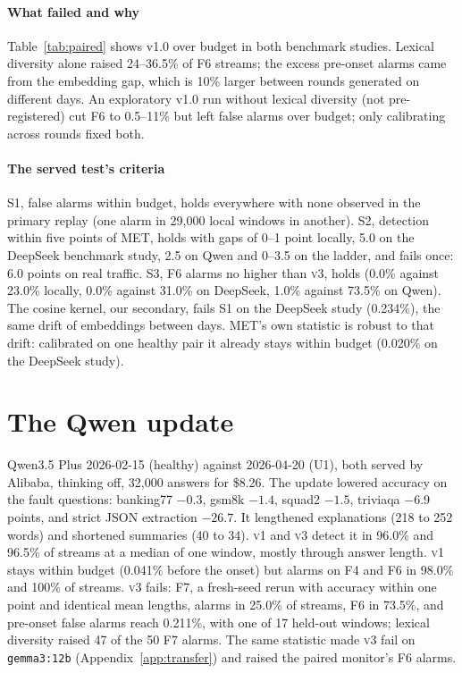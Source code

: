 \documentclass[11pt]{article}
\newcommand{\vone}{\textsc{v1}}
\newcommand{\vthree}{\textsc{v3}}
\begin{document}
\paragraph{What failed and why} Table~\ref{tab:paired} shows v1.0 over budget in
both benchmark studies. Lexical diversity alone raised 24--36.5\% of F6 streams;
the excess pre-onset alarms came from the embedding gap, which is 10\% larger
between rounds generated on different days. An exploratory v1.0 run without lexical
diversity (not pre-registered) cut F6 to 0.5--11\% but left false alarms over
budget; only calibrating across rounds fixed both.

\paragraph{The served test's criteria} S1, false alarms within budget, holds
everywhere with none observed in the primary replay (one alarm in 29{,}000 local
windows in another). S2, detection within five points of MET, holds with gaps of
0--1 point locally, 5.0 on the DeepSeek benchmark study, 2.5 on Qwen and 0--3.5 on
the ladder, and fails once: 6.0 points on real traffic. S3, F6 alarms no higher
than \vthree{}, holds (0.0\% against 23.0\% locally, 0.0\% against 31.0\% on
DeepSeek, 1.0\% against 73.5\% on Qwen). The cosine kernel, our secondary, fails S1
on the DeepSeek study (0.234\%), the same drift of embeddings between days.
MET's own statistic is robust to that drift: calibrated on one healthy pair it
already stays within budget (0.020\% on the DeepSeek study).

\section{The Qwen update}
\label{app:qwen}

Qwen3.5 Plus 2026-02-15 (healthy) against 2026-04-20 (U1), both served by Alibaba,
thinking off, 32{,}000 answers for \$8.26. The update lowered accuracy on the fault
questions: banking77 $-0.3$, gsm8k $-1.4$, squad2 $-1.5$, triviaqa $-6.9$ points,
and strict JSON extraction $-26.7$. It lengthened explanations (218 to 252 words)
and shortened summaries (40 to 34). \vone{} and \vthree{} detect it in 96.0\% and
96.5\% of streams at a median of one window, mostly through answer length. \vone{}
stays within budget (0.041\% before the onset) but alarms on F4 and F6 in 98.0\% and
100\% of streams. \vthree{} fails: F7, a fresh-seed rerun with accuracy within one
point and identical mean lengths, alarms in 25.0\% of streams, F6 in 73.5\%, and
pre-onset false alarms reach 0.211\%, with one of 17 held-out windows; lexical
diversity raised 47 of the 50 F7 alarms. The same statistic made \vthree{} fail on
\texttt{gemma3:12b} (Appendix~\ref{app:transfer}) and raised the paired monitor's
F6 alarms.
\end{document}

